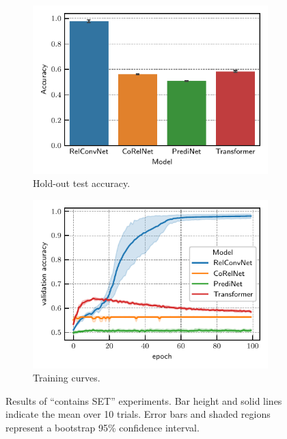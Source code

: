 \begin{figure}
    \begin{subfigure}{0.5\textwidth}
        \centering
        \includegraphics[width=\textwidth]{figs/experiments/contains_set_acc.pdf}
        \caption{Hold-out test accuracy.}\label{fig:contains_set_acc}
    \end{subfigure}
    \begin{subfigure}{0.5\textwidth}
        \centering
        \includegraphics[width=\textwidth]{figs/experiments/contains_set_training_curves.pdf}
        \caption{Training curves.}\label{fig:contains_set_training_curves}
    \end{subfigure}
    \caption{Results of ``contains SET'' experiments. Bar height and solid lines indicate the mean over 10 trials. Error bars and shaded regions represent a bootstrap 95\% confidence interval.}\label{fig:contains_set}
\end{figure}